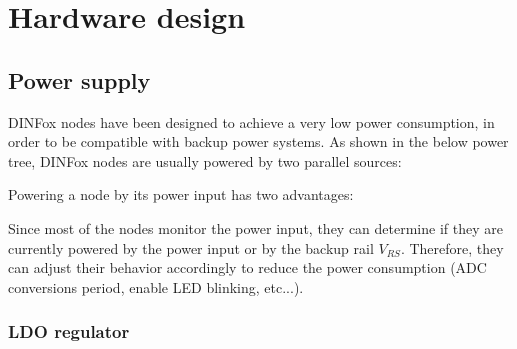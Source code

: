 \section{Hardware design}

\subsection{Power supply}

DINFox nodes have been designed to achieve a very low power consumption, in order to be compatible with backup power systems. As shown in the below power tree, DINFox nodes are usually powered by two parallel sources:


\begin{figure}[h]
    \centering
    \vspace*{\baselineskip}
\end{figure}

Powering a node by its power input has two advantages:


Since most of the nodes monitor the power input, they can determine if they are currently powered by the power input or by the backup rail $ V_{RS} $. Therefore, they can adjust their behavior accordingly to reduce the power consumption (ADC conversions period, enable LED blinking, etc...).

\subsubsection{LDO regulator}

